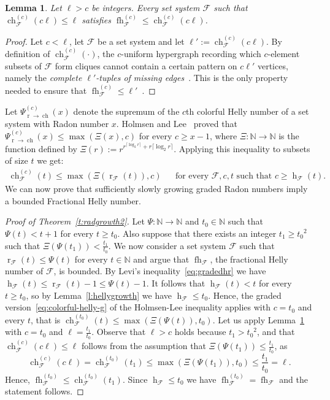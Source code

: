 \documentclass[11pt]{article}
\newcommand{\N}{\mathbb{N}}
\newcommand{\F}{\mathcal{F}}
\DeclareMathOperator{\h}{h}
\DeclareMathOperator{\rad}{r}
\DeclareMathOperator{\ch}{ch}
\DeclareMathOperator{\fh}{fh}
\newcommand{\pth}[1]{\left(#1\right)}
\newtheorem{lemma}{Lemma}[section]
\begin{document}
%
%
\begin{lemma}\label{l:holmsen-graded}
Let $\ell > c$ be integers. Every set system $\F$ such that $\ch^{(c)}_\F(c\ell) \leq \ell$ satisfies $\fh^{(c)}_\F \leq \ch^{(c)}_\F(c\ell)$.
\end{lemma}
\begin{proof}
  Let $c< \ell$, let $\F$ be a set system and let $\ell':=\ch^{(c)}_\F(c\ell)$. By definition of $\ch^{(c)}_\F(\cdot)$, the $c$-uniform hypergraph recording which $c$-element subsets of $\F$ form cliques cannot contain a certain pattern on $c\ell'$ vertices, namely the \emph{complete $\ell'$-tuples of missing edges}~\cite[$\mathsection 3$]{Holmsen2021}. This is the only property needed to ensure that $\fh^{(c)}_\F \leq \ell'$~\cite[Theorem~1.2]{Holmsen2020}.
\end{proof}
%
\medskip
%
  Let $\Psi_{\rad \to \ch}^{(c)}(x)$ denote the supremum of the $c$th colorful Helly number of a set system with Radon number $x$. Holmsen and Lee~\cite[Theorem~2.2]{Holmsen2021} proved that $\Psi_{\rad \to \ch}^{(c)}(x) \le \max\pth{\Xi(x),c}$ for every $c \ge x-1$, where  $\Xi: \N \to \N$ is the function defined by $\Xi(r) := r^{r^{\lceil \log_2r \rceil}+r\lceil \log_2r \rceil}$. Applying this inequality to subsets of size $t$ we get:
%
\begin{align}\label{eq:colorful-helly-g}
  \ch^{(c)}_\F(t) \leq \max\pth{\Xi\pth{\rad_\F(t)},c} && \text{for every } \F, c, t \text{ such that } c \ge \h_\F(t).
\end{align}
%
\medskip
%
We can now prove that sufficiently slowly growing graded Radon numbers imply a bounded Fractional Helly number.
%
\begin{proof}[Proof of Theorem~\ref{t:radgrowth2}]
  Let $\Psi: \N\rightarrow \N$ and $t_0 \in \N$ such that $\Psi(t) < t+1$ for every $t \ge t_0$. Also suppose that there exists an integer $t_1 \ge {t_0}^2$ such that $\Xi\pth{\Psi(t_1)} < \frac{t_1}{t_0}$. We now consider a set system $\F$ such that $\rad_\F(t) \le \Psi(t)$ for every $t \in \N$ and argue that $\fh_\F$, the fractional Helly number of $\F$, is bounded. 
%
  \medskip
%
  By Levi's inequality~\eqref{eq:gradedhr} we have $\h_\F(t) \le \rad_\F(t) -1 \le \Psi(t) -1$. It follows that $\h_\F(t) < t$ for every $t \ge t_0$, so by Lemma~\ref{l:hellygrowth} we have $\h_\F \le t_0$. Hence, the graded version~\eqref{eq:colorful-helly-g} of the Holmsen-Lee inequality applies with $c=t_0$ and every $t$, that is $\ch^{(t_0)}_\F(t) \leq \max\pth{\Xi\pth{\Psi(t)},t_0}$.
%
  \medskip
%
  Let us apply Lemma~\ref{l:holmsen-graded} with $c=t_0$ and $\ell = \frac{t_1}{t_0}$. Observe that $\ell > c$ holds because $t_1 > {t_0}^2$, and that $\ch^{(c)}_\F(c\ell) \le \ell$ follows from the assumption that $\Xi\pth{\Psi(t_1)} \le \frac{t_1}{t_0}$, as
%
  \[  \ch^{(c)}_\F(c\ell) = \ch^{(t_0)}_\F\pth{t_1} \le \max\pth{\Xi\pth{\Psi(t_1)},t_0} \le \frac{t_1}{t_0} = \ell.\]
%
Hence, $\fh^{(t_0)}_\F \leq \ch^{(t_0)}_\F(t_1)$. Since $\h_\F \le t_0$ we have $\fh^{(t_0)}_\F = \fh_\F$ and the statement follows.  
\end{proof}
%
%
%
%
%
\appendix
%
\end{document}
